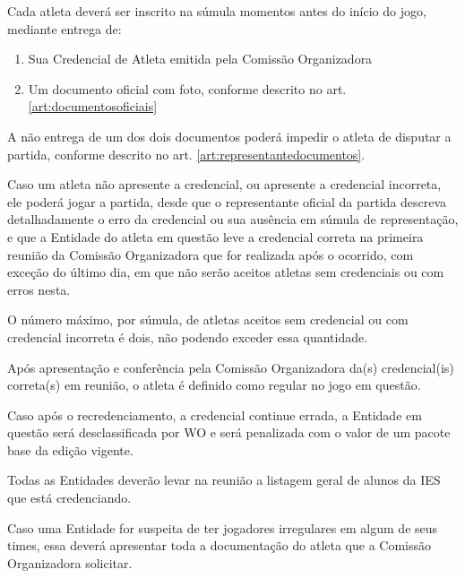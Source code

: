 \begin{article}
    Cada atleta deverá ser inscrito na súmula momentos antes do início do jogo, mediante entrega de:
	\begin{enumerate}[noitemsep,leftmargin=2\parindent]
		\item Sua Credencial de Atleta emitida pela Comissão Organizadora
		\item Um documento oficial com foto, conforme descrito no art. \ref{art:documentosoficiais}\ulo
	\end{enumerate}

	\begin{xparagraph}
	     A não entrega de um dos dois documentos poderá impedir o atleta de disputar a partida, conforme descrito no art. \ref{art:representantedocumentos}\ulo.
	\end{xparagraph}
\end{article}

\begin{article}
    Caso um atleta não apresente a credencial, ou apresente a credencial incorreta, ele poderá jogar a partida, desde que o representante oficial da partida descreva detalhadamente o erro da credencial ou sua ausência em súmula de representação, e que a Entidade do atleta em questão leve a credencial correta na primeira reunião da Comissão Organizadora que for realizada após o ocorrido, com exceção do último dia, em que não serão aceitos atletas sem credenciais ou com erros nesta.

	\begin{xparagraph}
	    O número máximo, por súmula, de atletas aceitos sem credencial ou com credencial incorreta é dois, não podendo exceder essa quantidade.
	\end{xparagraph}

	\begin{xparagraph}
	    Após apresentação e conferência pela Comissão Organizadora da(s) credencial(is) correta(s) em reunião, o atleta é definido como regular no jogo em questão.
	\end{xparagraph}

	\begin{xparagraph}
	    Caso após o recredenciamento, a credencial continue errada, a Entidade em questão será desclassificada por WO e será penalizada com o valor de um pacote base da edição vigente.
	\end{xparagraph}
\end{article}

\begin{article}
    Todas as Entidades deverão levar na reunião a listagem geral de alunos da IES que está credenciando.
\end{article}

\begin{article}
    Caso uma Entidade for suspeita de ter jogadores irregulares em algum de seus times, essa deverá apresentar toda a documentação do atleta que a Comissão Organizadora solicitar.
\end{article}
